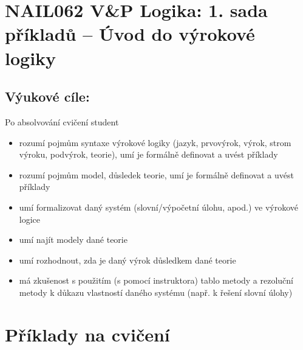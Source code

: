 \section*{NAIL062 V\&P Logika: 1. sada příkladů -- Úvod do výrokové logiky}

\subsection*{Výukové cíle:} Po absolvování cvičení student

    \begin{itemize}\setlength{\itemsep}{0pt}
        \item rozumí pojmům syntaxe výrokové logiky (jazyk, prvovýrok, výrok, strom výroku, podvýrok, teorie), umí je formálně definovat a uvést příklady
        \item rozumí pojmům model, důsledek teorie, umí je formálně definovat a uvést příklady
        \item umí formalizovat daný systém (slovní/výpočetní úlohu, apod.) ve výrokové logice
        \item umí najít modely dané teorie
        \item umí rozhodnout, zda je daný výrok důsledkem dané teorie
        \item má zkušenost s použitím (s pomocí instruktora) tablo metody a rezoluční metody k důkazu vlastností daného systému (např. k řešení slovní úlohy)
    \end{itemize}


\section*{Příklady na cvičení}


